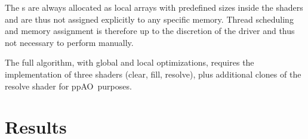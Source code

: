 \documentclass{egpubl}
\newcommand{\todo}[1]{{\color{red}\emph{(#1)}}}
\newcommand{\stencil}{ppAO}
\begin{document}
The \bArray{}s are always allocated as local arrays with predefined sizes inside the shaders and are thus not assigned explicitly to any specific memory. 
Thread scheduling and memory assignment is therefore up to the discretion of the driver and thus not necessary to perform manually. 

The full algorithm, with global and local optimizations, requires the implementation of three shaders (clear, fill, resolve), plus additional clones of the resolve shader for \stencil\ purposes.




\section{Results}
\label{sec:results}

\end{document}
